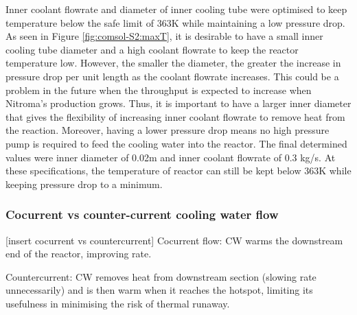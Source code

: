 Inner coolant flowrate and diameter of inner cooling tube were optimised to keep temperature below the safe limit of 363K while maintaining a low pressure drop. As seen in Figure \ref{fig:comsol-S2:maxT}, it is desirable to have a small inner cooling tube diameter and a high coolant flowrate to keep the reactor temperature low. However, the smaller the diameter, the greater the increase in pressure drop per unit length as the coolant flowrate increases. This could be a problem in the future when the throughput is expected to increase when Nitroma's production grows. Thus, it is important to have a larger inner diameter that gives the flexibility of increasing inner coolant flowrate to remove heat from the reaction. Moreover, having a lower pressure drop means no high pressure pump is required to feed the cooling water into the reactor. The final determined values were inner diameter of 0.02m and inner coolant flowrate of 0.3 kg/s. At these specifications, the temperature of reactor can still be kept below 363K while keeping pressure drop to a minimum.

\subsubsection{Cocurrent vs counter-current cooling water flow}
[insert cocurrent vs countercurrent]
Cocurrent flow: CW warms the downstream end of the reactor, improving rate.

Countercurrent: CW removes heat from downstream section (slowing rate unnecessarily) and is then warm when it reaches the hotspot, limiting its usefulness in minimising the risk of thermal runaway.

